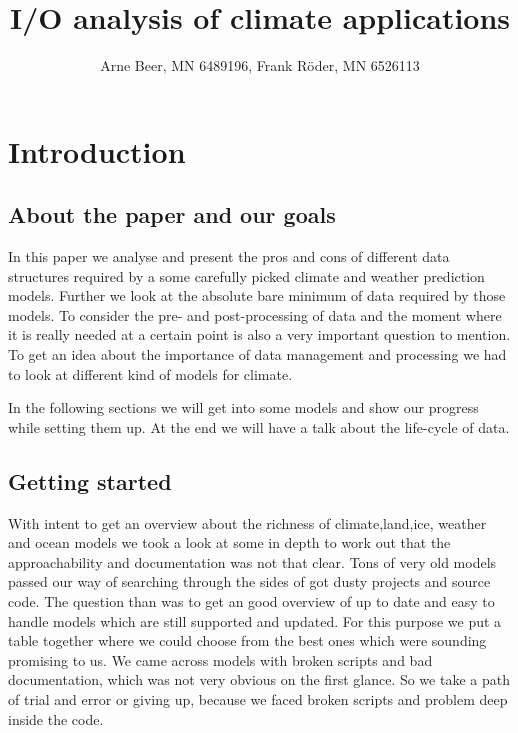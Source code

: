 \documentclass[]{article}
\title{I/O analysis of climate applications}
\author{Arne Beer, MN 6489196, Frank Röder, MN 6526113}
\date{}
\begin{document}
\maketitle

{
\setcounter{tocdepth}{3}
\tableofcontents
}
\pagebreak

\section{Introduction}\label{introduction}

\subsection{About the paper and our
goals}\label{about-the-paper-and-our-goals}

In this paper we analyse and present the pros and cons of different data
structures required by a some carefully picked climate and weather
prediction models. Further we look at the absolute bare minimum of data
required by those models. To consider the pre- and post-processing of
data and the moment where it is really needed at a certain point is also
a very important question to mention. To get an idea about the
importance of data management and processing we had to look at different
kind of models for climate.

In the following sections we will get into some models and show our
progress while setting them up. At the end we will have a talk about the
life-cycle of data.

\subsection{Getting started}\label{getting-started}

With intent to get an overview about the richness of climate,land,ice,
weather and ocean models we took a look at some in depth to work out
that the approachability and documentation was not that clear. Tons of
very old models passed our way of searching through the sides of got
dusty projects and source code. The question than was to get an good
overview of up to date and easy to handle models which are still
supported and updated. For this purpose we put a table together where we
could choose from the best ones which were sounding promising to us. We
came across models with broken scripts and bad documentation, which was
not very obvious on the first glance. So we take a path of trial and
error or giving up, because we faced broken scripts and problem deep
inside the code.
\end{document}
